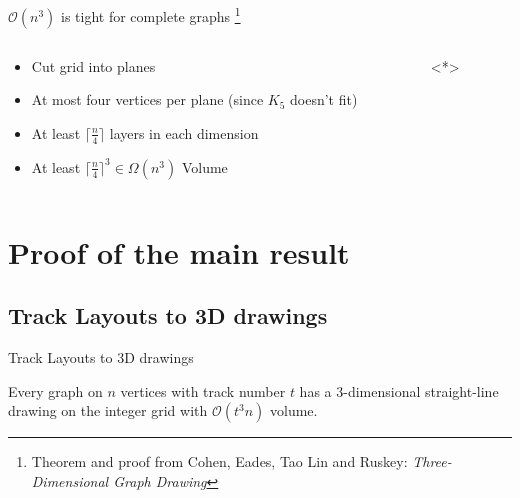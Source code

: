 \documentclass[t]{beamer}
\newcommand\footcite[1]{%
  \begingroup
  \renewcommand\thefootnote{}\footnote{#1}%
  \addtocounter{footnote}{-1}%
  \endgroup
}
\begin{document}
\begin{frame}{$\mathcal O(n^3)$ is tight for complete graphs}
    \footcite{Theorem and proof from Cohen, Eades, Tao Lin and Ruskey: \textit{Three-Dimensional Graph Drawing}}
    \begin{columns}
	\begin{column}{0.4\textwidth}
	    \begin{itemize}
		\item Cut grid into planes \pause
		\item At most four vertices per plane (since $K_5$ doesn't fit)\pause
		\item At least $\lceil\frac{n}{4}\rceil$ layers in each dimension\pause
		\item At least $\lceil\frac{n}{4}\rceil^{3} \in \Omega(n^3)$ Volume
	    \end{itemize}
	\end{column}
	\begin{column}{0.6\textwidth}
	    \only<*>{
		\begin{center}
		\end{center}
	    }
	\end{column}
    \end{columns}
\end{frame}

\section{Proof of the main result}

\subsection{Track Layouts to 3D drawings}

\begin{frame}{Track Layouts to 3D drawings}
    \begin{theorem}
	Every graph on $n$ vertices with track number $t$ has a 3-dimensional straight-line drawing on the integer grid with $\mathcal O(t^3n)$ volume.
    \end{theorem}
\end{frame}
\end{document}
